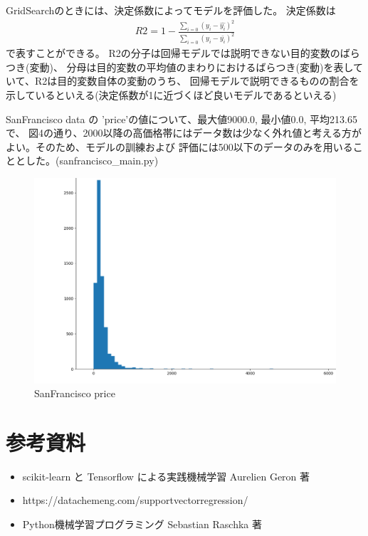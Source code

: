 \documentclass{jsarticle}
\begin{document}
GridSearchのときには、決定係数によってモデルを評価した。
決定係数は
\begin{eqnarray}
R2 = 1 - \frac{\sum_{i=0} (y_i - \hat{y_i})^2}{\sum_{i=0} (y_i - \bar{y_i})^2}
\end{eqnarray}
で表すことができる。
R2の分子は回帰モデルでは説明できない目的変数のばらつき(変動)、
分母は目的変数の平均値のまわりにおけるばらつき(変動)を表していて、R2は目的変数自体の変動のうち、
回帰モデルで説明できるものの割合を示しているといえる(決定係数が1に近づくほど良いモデルであるといえる)

SanFrancisco data の 'price'の値について、最大値9000.0, 最小値0.0, 平均213.65で、
図4の通り、2000以降の高価格帯にはデータ数は少なく外れ値と考える方がよい。そのため、モデルの訓練および
評価には500以下のデータのみを用いることとした。(sanfrancisco\_main.py)
\begin{figure}[!h]
\includegraphics[width=18cm]{prices.png}
\caption{SanFrancisco price}
\end{figure}

\section{参考資料}
\begin{itemize}
    \item scikit-learn と Tensorflow による実践機械学習 Aurelien Geron 著
    \item https://datachemeng.com/supportvectorregression/
    \item Python機械学習プログラミング Sebastian Raschka 著
\end{itemize}
\end{document}
